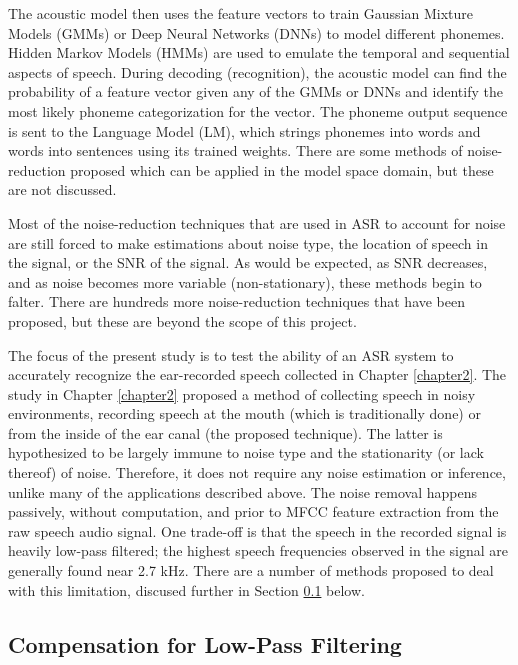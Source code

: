 The acoustic model then uses the feature vectors to train Gaussian Mixture Models (GMMs) or Deep Neural Networks (DNNs) to model different phonemes.  Hidden Markov Models (HMMs) are used to emulate the temporal and sequential aspects of speech. During decoding (recognition), the acoustic model can find the probability of a feature vector given any of the GMMs or DNNs and identify the most likely phoneme categorization for the vector.  The phoneme output sequence is sent to the Language Model (LM), which strings phonemes into words and words into sentences using its trained weights.  There are some methods of noise-reduction proposed which can be applied in the model space domain, but these are not discussed.

Most of the noise-reduction techniques that are used in ASR to account for noise are still forced to make estimations about noise type, the location of speech in the signal, or the SNR of the signal.  As would be expected, as SNR decreases, and as noise becomes more variable (non-stationary), these methods begin to falter.  There are hundreds more noise-reduction techniques that have been proposed, but these are beyond the scope of this project.

The focus of the present study is to test the ability of an ASR system to accurately recognize the ear-recorded speech collected in Chapter \ref{chapter2}.  The study in Chapter \ref{chapter2} proposed a method of collecting speech in noisy environments, recording speech at the mouth (which is traditionally done) or from the inside of the ear canal (the proposed technique).  The latter is hypothesized to be largely immune to noise type and the stationarity (or lack thereof) of noise.  Therefore, it does not require any noise estimation or inference, unlike many of the applications described above.  The noise removal happens passively, without computation, and prior to MFCC feature extraction from the raw speech audio signal.  One trade-off is that the speech in the recorded signal is heavily low-pass filtered; the highest speech frequencies observed in the signal are generally found near 2.7 kHz.  There are a number of methods proposed to deal with this limitation, discused further in Section \ref{sec:lpf-compensation} below.


\subsection{Compensation for Low-Pass Filtering}\label{sec:lpf-compensation}

